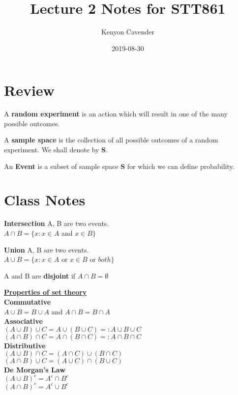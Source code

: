 \documentclass[12pt, oneside, letterpaper]{notes}
\begin{document}
\title{Lecture 2 Notes for STT861}
\author{Kenyon Cavender}
\date{2019-08-30}
\maketitle

\section{Review}

\begin{mydef}
  A \textbf{random experiment} is an action which will result 
  in one of the many possible outcomes. 
\end{mydef}

\begin{mydef}
  A \textbf{sample space} is the collection of all possible 
  outcomes of a random experiment.  We shall denote by \textbf{S}.
\end{mydef}

\begin{mydef}
  An \textbf{Event} is a subset of sample space \textbf{S} for 
  which we can define probability.
\end{mydef}

\section{Class Notes}
\begin{mydef}
  \textbf{Intersection} A, B are two events.  \\
  \indent $A \cap B = \{x: x \in A$ and $x \in B\}$
\end{mydef}

\begin{mydef}
  \textbf{Union} A, B are two events. \\
  \indent $A \cup B = \{x: x \in A$ or $x \in B$ or $both\}$
\end{mydef}

\begin{mydef}
  A and B are \textbf{disjoint} if $A \cap B = \emptyset$
\end{mydef}

\noindent \underline{\textbf{Properties of set theory}}  \\
\textbf{Commutative}  \\
\indent $A \cup B = B \cup A$ and $A \cap B = B \cap A$ \\
\textbf{Associative}\\
\indent $(A \cup B) \cup C = A \cup (B \cup C) =: A \cup B \cup C$ \\
\indent $(A \cap B) \cap C = A \cap (B \cap C) =: A \cap B \cap C$ \\
\textbf{Distributive}\\
\indent $(A \cup B) \cap C = (A \cap C) \cup (B \cap C)$ \\
\indent $(A \cap B) \cup C = (A \cup C) \cap (B \cup C)$ \\
\textbf{De Morgan's Law}\\
\indent $(A \cup B)^c = A^c \cap B^c$ \\
\indent $(A \cap B)^c = A^c \cup B^c$ \\
\end{document}
